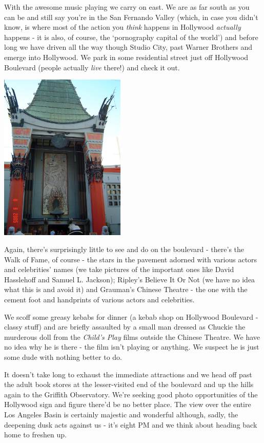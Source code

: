 \documentclass[a5paper,titlepage,11pt]{book}
\begin{document}
With the awesome music playing we carry on east.  We are as far south as you can be and still say you're in the San Fernando Valley (which, in case you didn't know, is where most of the action you \emph{think} happens in Hollywood \emph{actually} happens - it is also, of course, the `pornography capital of the world') and before long we have driven all the way though Studio City, past Warner Brothers and emerge into Hollywood.  We park in some residential street just off Hollywood Boulevard (people actually \emph{live} there!) and check it out.

\begin{center}\includegraphics[height=80mm]{gfx/DSC00806}\end{center}

Again, there's surprisingly little to see and do on the boulevard - there's the Walk of Fame, of course - the stars in the pavement adorned with various actors and celebrities' names (we take pictures of the important ones like David Hasslehoff and Samuel L. Jackson); Ripley's Believe It Or Not (we have no idea what this is and avoid it) and Grauman's Chinese Theatre - the one with the cement foot and handprints of various actors and celebrities.

We scoff some greasy kebabs for dinner (a kebab shop on Hollywood Boulevard - classy stuff) and are briefly assaulted by a small man dressed as Chuckie the murderous doll from the \emph{Child's Play} films outside the Chinese Theatre.  We have no idea why he is there - the film isn't playing or anything.  We suspect he is just some dude with nothing better to do.

It doesn't take long to exhaust the immediate attractions and we head off past the adult book stores at the lesser-visited end of the boulevard and up the hills again to the Griffith Observatory.  We're seeking good photo opportunities of the Hollywood sign and figure there'd be no better place.  The view over the entire Los Angeles Basin is certainly majestic and wonderful although, sadly, the deepening dusk acts against us - it's eight PM and we think about heading back home to freshen up.
\end{document}
